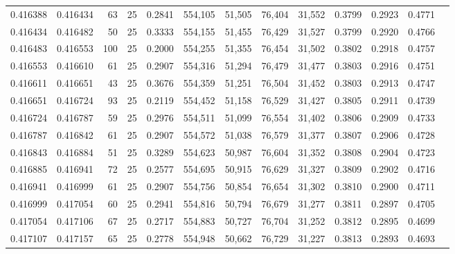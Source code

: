 \begin{tabular}{rrrrrrrrrrrrr}
0.416388 & 0.416434 &    63 &  25 &                                     0.2841 & 554,105 &  51,505 &  76,404 &  31,552 & 0.3799 & 0.2923 & 0.4771 \\
0.416434 & 0.416482 &    50 &  25 &                                     0.3333 & 554,155 &  51,455 &  76,429 &  31,527 & 0.3799 & 0.2920 & 0.4766 \\
0.416483 & 0.416553 &   100 &  25 &                                     0.2000 & 554,255 &  51,355 &  76,454 &  31,502 & 0.3802 & 0.2918 & 0.4757 \\
0.416553 & 0.416610 &    61 &  25 &                                     0.2907 & 554,316 &  51,294 &  76,479 &  31,477 & 0.3803 & 0.2916 & 0.4751 \\
0.416611 & 0.416651 &    43 &  25 &                                     0.3676 & 554,359 &  51,251 &  76,504 &  31,452 & 0.3803 & 0.2913 & 0.4747 \\
0.416651 & 0.416724 &    93 &  25 &                                     0.2119 & 554,452 &  51,158 &  76,529 &  31,427 & 0.3805 & 0.2911 & 0.4739 \\
0.416724 & 0.416787 &    59 &  25 &                                     0.2976 & 554,511 &  51,099 &  76,554 &  31,402 & 0.3806 & 0.2909 & 0.4733 \\
0.416787 & 0.416842 &    61 &  25 &                                     0.2907 & 554,572 &  51,038 &  76,579 &  31,377 & 0.3807 & 0.2906 & 0.4728 \\
0.416843 & 0.416884 &    51 &  25 &                                     0.3289 & 554,623 &  50,987 &  76,604 &  31,352 & 0.3808 & 0.2904 & 0.4723 \\
0.416885 & 0.416941 &    72 &  25 &                                     0.2577 & 554,695 &  50,915 &  76,629 &  31,327 & 0.3809 & 0.2902 & 0.4716 \\
0.416941 & 0.416999 &    61 &  25 &                                     0.2907 & 554,756 &  50,854 &  76,654 &  31,302 & 0.3810 & 0.2900 & 0.4711 \\
0.416999 & 0.417054 &    60 &  25 &                                     0.2941 & 554,816 &  50,794 &  76,679 &  31,277 & 0.3811 & 0.2897 & 0.4705 \\
0.417054 & 0.417106 &    67 &  25 &                                     0.2717 & 554,883 &  50,727 &  76,704 &  31,252 & 0.3812 & 0.2895 & 0.4699 \\
0.417107 & 0.417157 &    65 &  25 &                                     0.2778 & 554,948 &  50,662 &  76,729 &  31,227 & 0.3813 & 0.2893 & 0.4693 \\

\end{tabular}
